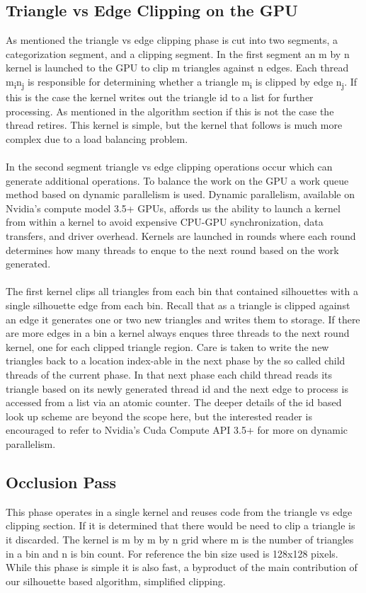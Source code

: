 \documentclass[review]{acmsiggraph}
\begin{document}
\subsection{Triangle vs Edge Clipping on the GPU}
As mentioned the triangle vs edge clipping phase is cut into two segments, a categorization segment, and a clipping segment. In the first segment an m by n kernel is launched to the GPU to clip m triangles against n edges. Each thread m\textsubscript{i}n\textsubscript{j} is responsible for determining whether a triangle  m\textsubscript{i} is clipped by edge n\textsubscript{j}. If this is the case the kernel writes out the triangle id to a list for further processing. As mentioned in the algorithm section if this is not the case the thread retires. This kernel is simple, but the kernel that follows is much more complex due to a load balancing problem.
\\\\
In the second segment triangle vs edge clipping operations occur which can generate additional operations. To balance the work on the GPU a work queue method based on dynamic parallelism is used. Dynamic parallelism, available on Nvidia’s compute model 3.5+ GPUs, affords us the ability to launch a kernel from within a kernel to avoid expensive CPU-GPU synchronization, data transfers, and driver overhead. Kernels are launched in rounds where each round determines how many threads to enque to the next round based on the work generated.
\\\\
The first kernel clips all triangles from each bin that contained silhouettes with a single silhouette edge from each bin. Recall that as a triangle is clipped against an edge it generates one or two new triangles and writes them to storage. If there are more edges in a bin a kernel always enques three threads to the next round kernel, one for each clipped triangle region. Care is taken to write the new triangles back to a location index-able in the next phase by the so called child threads of the current phase. In that next phase each child thread reads its triangle based on its newly generated thread id and the next edge to process is accessed from a list via an atomic counter. The deeper details of the id based look up scheme are beyond the scope here, but the interested reader is encouraged to refer to Nvidia’s Cuda Compute API 3.5+ for more on dynamic parallelism. 

\subsection{Occlusion Pass}
This phase operates in a single kernel and reuses code from the triangle vs edge clipping section. If it is determined that there would be need to clip a triangle is it discarded. The kernel is m by m by n grid where m is the number of triangles in a bin and n is bin count. For reference the bin size used is 128x128 pixels. While this phase is simple it is also fast, a byproduct of the main contribution of our silhouette based algorithm, simplified clipping.
\end{document}

